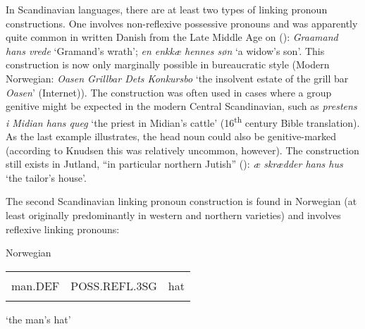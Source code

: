 \begin{styleBodytextC}
In Scandinavian languages, there are at least two types of linking pronoun constructions. One involves non-reflexive possessive pronouns and was apparently quite common in written Danish from the Late Middle Age on (\citet[61]{Knudsen1941}): \textit{Graamand hans vrede }‘Gramand’s wrath’; \textit{en enkkæ hennes søn} ‘a widow’s son’. This construction is now only marginally possible in bureaucratic style (Modern Norwegian: \textit{Oasen Grillbar Dets Konkursbo} ‘the insolvent estate of the grill bar \textit{Oasen}’ (Internet)). The construction was often used in cases where a group genitive might be expected in the modern Central Scandinavian, such as \textit{prestens i Midian hans queg} ‘the priest in Midian’s cattle’ (16\textsuperscript{th} century Bible translation). As the last example illustrates, the head noun could also be genitive-marked (according to Knudsen this was relatively uncommon, however). The construction still exists in Jutland, “in particular northern Jutish” (\citet[62]{Knudsen1941}): \textit{æ skrædder hans hus} ‘the tailor’s house’.

\end{styleBodytextC}

\begin{styleBodytextC}
The second Scandinavian linking pronoun construction is found in Norwegian (at least originally predominantly in western and northern varieties) and involves reflexive linking pronouns:

\end{styleBodytextC}

\begin{listWWNumileveli}
\item 

\begin{styleExample}
Norwegian

\end{styleExample}

\end{listWWNumileveli}

\begin{tabular}{lll}
\lsptoprule
\multicolumn{3}{l}{mannen

}\\
man.DEF & POSS.REFL.3SG & hat\\
\lspbottomrule
\end{tabular}

\begin{styleTranslation}
‘the man’s hat’

\end{styleTranslation}

